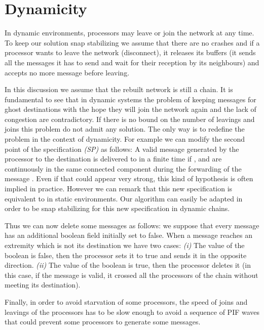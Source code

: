 \documentclass{llncs}
\begin{document}
\section{Dynamicity\label{sec:dynamicity}}

In dynamic environments, processors may leave or join the network at any time. To keep our solution snap stabilizing we assume that there are no crashes and if a processor wants to leave the network (disconnect), it releases its buffers (it sends all the messages it has to send and wait for their reception by its neighbours) and accepts no more message before leaving.

In this discussion we assume that the rebuilt network is still a chain. It is fundamental to see that in dynamic
systems the problem of keeping messages for ghost destinations with the hope they will join the network again and the
lack of congestion are contradictory. If there is no bound on the number of leavings and joins this problem do not
admit any solution. The only way is to redefine the problem in the context of dynamicity. For example we can modify
the second point of the specification \textit{(SP)} as follows: A valid message  generated by the processor  to
the destination  is delivered to  in a finite time if ,  and  are continuously in the same connected
component during the forwarding of the message . Even if that could appear very strong, this kind of hypothesis is
often implied in practice. However we can remark that this new specification is equivalent to  in static
environments. Our algorithm can easily be adapted in order to be snap stabilizing for this new specification in
dynamic chains. 

Thus we can now delete some messages as follows: we suppose that every message has an additional boolean field
initially set to false. When a message reaches an extremity which is not its destination we have two cases:
\textit{(i)} The value of the boolean is false, then the processor sets it to true and sends it in the opposite
direction. \textit{(ii)} The value of the boolean is true, then the processor deletes it (in this case, if the message
is valid, it crossed all the processors of the chain without meeting its destination).

Finally, in order to avoid starvation of some processors, the speed of joins and leavings of the processors has to be
slow enough to avoid a sequence of PIF waves that could prevent some processors to generate some messages.
\end{document}
